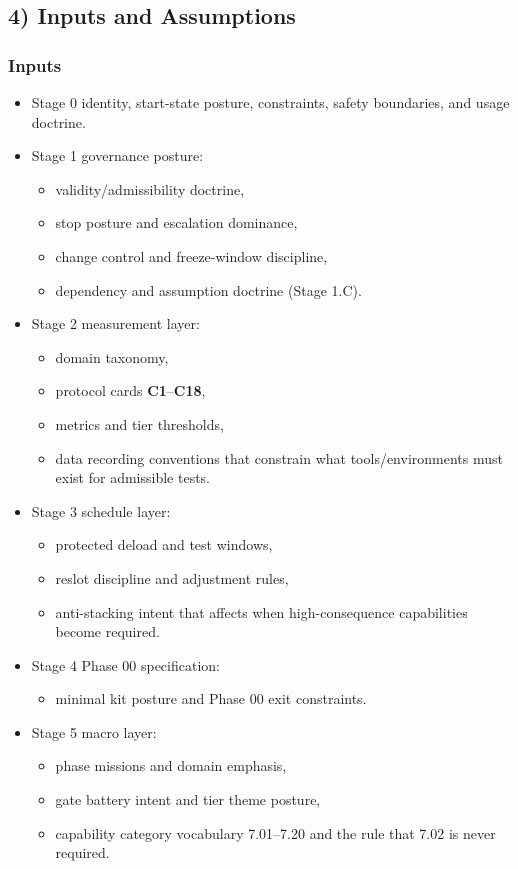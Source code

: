 \documentclass[10pt]{article}
\begin{document}
\subsection*{4) Inputs and Assumptions}

\subsubsection*{Inputs}

\begin{itemize}
\item Stage 0 identity, start-state posture, constraints, safety boundaries, and usage doctrine.
\item Stage 1 governance posture:
  \begin{itemize}
  \item validity/admissibility doctrine,
  \item stop posture and escalation dominance,
  \item change control and freeze-window discipline,
  \item dependency and assumption doctrine (Stage 1.C).
  \end{itemize}
\item Stage 2 measurement layer:
  \begin{itemize}
  \item domain taxonomy,
  \item protocol cards \textbf{C1}–\textbf{C18},
  \item metrics and tier thresholds,
  \item data recording conventions that constrain what tools/environments must exist for admissible tests.
  \end{itemize}
\item Stage 3 schedule layer:
  \begin{itemize}
  \item protected deload and test windows,
  \item reslot discipline and adjustment rules,
  \item anti-stacking intent that affects when high-consequence capabilities become required.
  \end{itemize}
\item Stage 4 Phase 00 specification:
  \begin{itemize}
  \item minimal kit posture and Phase 00 exit constraints.
  \end{itemize}
\item Stage 5 macro layer:
  \begin{itemize}
  \item phase missions and domain emphasis,
  \item gate battery intent and tier theme posture,
  \item capability category vocabulary 7.01–7.20 and the rule that 7.02 is never required.
  \end{itemize}
\end{itemize}
\end{document}
